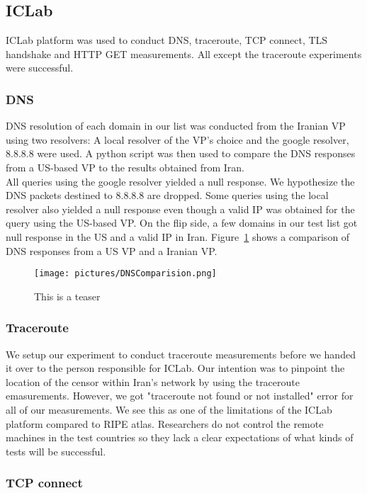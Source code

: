 \subsection{ICLab}
ICLab platform was used to conduct DNS, traceroute, TCP connect, TLS handshake and HTTP GET measurements. All except the traceroute experiments were successful.
\subsubsection{DNS} DNS resolution of each domain in our list was conducted from the Iranian VP using two resolvers: A local resolver of the VP's choice and the google resolver, 8.8.8.8 were used. A python script was then used to compare the DNS responses from a US-based VP to the results obtained from Iran.\\ 
All queries using the google resolver yielded a null response. We hypothesize the DNS packets destined to 8.8.8.8 are dropped. Some queries using the local resolver also yielded a null response even though a valid IP was obtained for the query using the US-based VP. On the flip side, a few domains in our test list got null response in the US and a valid IP in Iran. Figure~\ref{fig:DNSCompare} shows a comparison of DNS responses from a US VP and a Iranian VP.\\

\begin{figure}
\texttt{[image: pictures/DNSComparision.png]}
  \caption{This is a teaser}
  \label{fig:DNSCompare}
\end{figure}

\subsubsection{Traceroute} We setup our experiment to conduct traceroute measurements before we handed it over to the person responsible for ICLab. Our intention was to pinpoint the location of the censor within Iran’s network by using the traceroute emasurements. However, we got "traceroute not found or not installed" error for all of our measurements. We see this as one of the limitations of the ICLab platform compared to RIPE atlas. Researchers do not control the remote machines in the test countries so they lack a clear expectations of what kinds of tests will be successful. \\
\subsubsection{TCP connect} 
